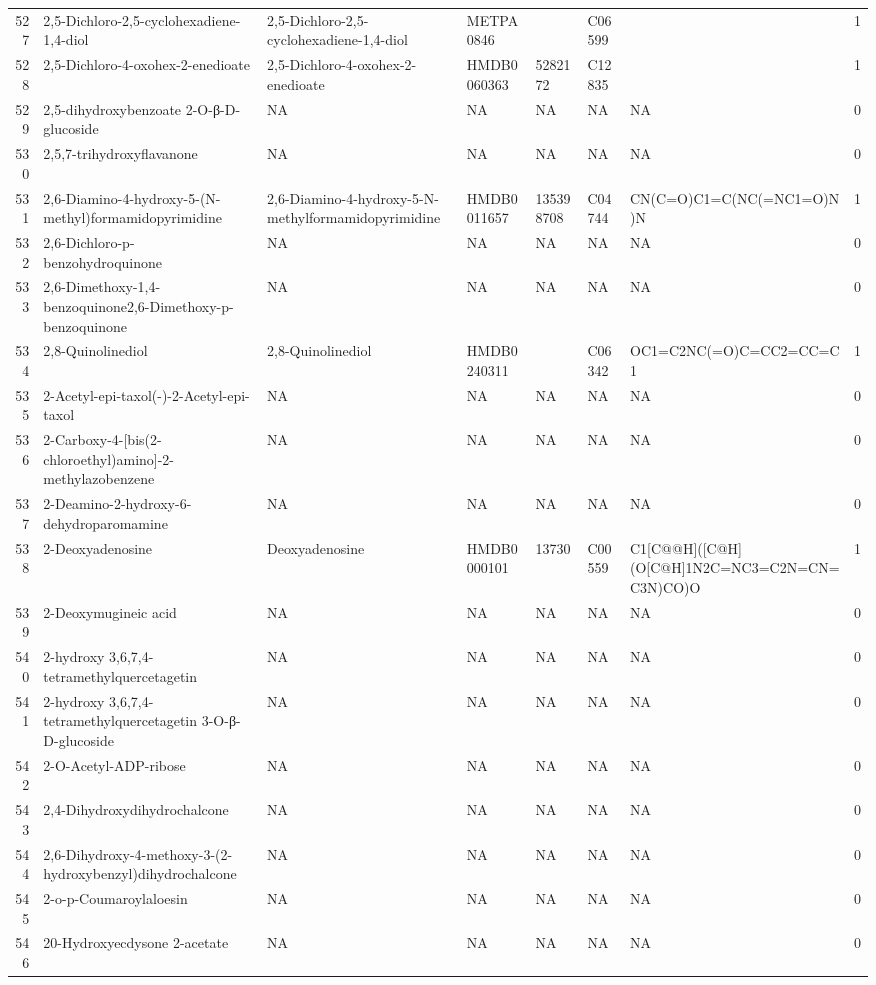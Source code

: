 \documentclass[a4paper]{article}
\begin{document}
\begin{longtable}{rlllllll}
  527 & 2,5-Dichloro-2,5-cyclohexadiene-1,4-diol & 2,5-Dichloro-2,5-cyclohexadiene-1,4-diol & METPA0846 &  & C06599 &  & 1 \\ 
  528 & 2,5-Dichloro-4-oxohex-2-enedioate & 2,5-Dichloro-4-oxohex-2-enedioate & HMDB0060363 & 5282172 & C12835 &  & 1 \\ 
  529 & 2,5-dihydroxybenzoate 2-O-β-D-glucoside & NA & NA & NA & NA & NA & 0 \\ 
  530 & 2,5,7-trihydroxyflavanone & NA & NA & NA & NA & NA & 0 \\ 
  531 & 2,6-Diamino-4-hydroxy-5-(N-methyl)formamidopyrimidine & 2,6-Diamino-4-hydroxy-5-N-methylformamidopyrimidine & HMDB0011657 & 135398708 & C04744 & CN(C=O)C1=C(NC(=NC1=O)N)N & 1 \\ 
  532 & 2,6-Dichloro-p-benzohydroquinone & NA & NA & NA & NA & NA & 0 \\ 
  533 & 2,6-Dimethoxy-1,4-benzoquinone2,6-Dimethoxy-p-benzoquinone & NA & NA & NA & NA & NA & 0 \\ 
  534 & 2,8-Quinolinediol & 2,8-Quinolinediol & HMDB0240311 &  & C06342 & OC1=C2NC(=O)C=CC2=CC=C1 & 1 \\ 
  535 & 2-Acetyl-epi-taxol(-)-2-Acetyl-epi-taxol & NA & NA & NA & NA & NA & 0 \\ 
  536 & 2-Carboxy-4-[bis(2-chloroethyl)amino]-2-methylazobenzene & NA & NA & NA & NA & NA & 0 \\ 
  537 & 2-Deamino-2-hydroxy-6-dehydroparomamine & NA & NA & NA & NA & NA & 0 \\ 
  538 & 2-Deoxyadenosine & Deoxyadenosine & HMDB0000101 & 13730 & C00559 & C1[C@@H]([C@H](O[C@H]1N2C=NC3=C2N=CN=C3N)CO)O & 1 \\ 
  539 & 2-Deoxymugineic acid & NA & NA & NA & NA & NA & 0 \\ 
  540 & 2-hydroxy 3,6,7,4-tetramethylquercetagetin & NA & NA & NA & NA & NA & 0 \\ 
  541 & 2-hydroxy 3,6,7,4-tetramethylquercetagetin 3-O-β-D-glucoside & NA & NA & NA & NA & NA & 0 \\ 
  542 & 2-O-Acetyl-ADP-ribose & NA & NA & NA & NA & NA & 0 \\ 
  543 & 2,4-Dihydroxydihydrochalcone & NA & NA & NA & NA & NA & 0 \\ 
  544 & 2,6-Dihydroxy-4-methoxy-3-(2-hydroxybenzyl)dihydrochalcone & NA & NA & NA & NA & NA & 0 \\ 
  545 & 2-o-p-Coumaroylaloesin & NA & NA & NA & NA & NA & 0 \\ 
  546 & 20-Hydroxyecdysone 2-acetate & NA & NA & NA & NA & NA & 0 \\ 

\end{longtable}
\end{document}
